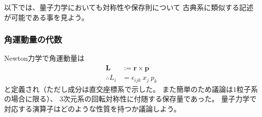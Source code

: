 以下では、量子力学においても対称性や保存則について
古典系に類似する記述が可能である事を見よう。

\subsubsection{角運動量の代数}
\label{subsubsec: angular momentum}

Newton力学で角運動量は
\begin{subequations}
\begin{align}
    \bm{L} &:= \bm{r} \times \bm{p}
    \\\therefore
    L_i &= \epsilon_{ijk} \ x_j \ p_k
\end{align}
\end{subequations}
と定義され（ただし成分は直交座標系で示した。
また簡単のため議論は$1$粒子系の場合に限る）、
3次元系の回転対称性に付随する保存量であった。
量子力学で対応する演算子はどのような性質を持つか議論しよう。

